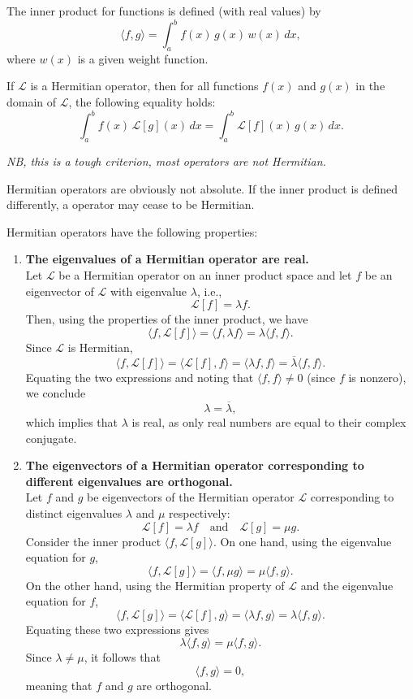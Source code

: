 \documentclass{report}
\begin{document}
The inner product for functions is defined (with real values) by
\[
\langle f, g \rangle = \int_a^b f(x)\, g(x)\, w(x) \, dx,
\]
where \(w(x)\) is a given weight function. 

If \(\mathcal{L}\) is a Hermitian operator, then for all functions \(f(x)\) and \(g(x)\) in the domain of \(\mathcal{L}\), the following equality holds:
\[
\int_a^b f(x)\, \mathcal{L}[g](x) \, dx = \int_a^b \mathcal{L}[f](x)\, g(x) \, dx.
\]

\emph{NB, this is a tough criterion, most operators are not Hermitian.}

Hermitian operators are obviously not absolute. If the inner product is defined differently, a operator may cease to be Hermitian.

Hermitian operators have the following properties:

\begin{enumerate}
  \item \textbf{The eigenvalues of a Hermitian operator are real.} \\
    Let \(\mathcal{L}\) be a Hermitian operator on an inner product space and let \(f\) be an eigenvector of \(\mathcal{L}\) with eigenvalue \(\lambda\), i.e.,
    \[
    \mathcal{L}[f] = \lambda f.
    \]
    Then, using the properties of the inner product, we have
    \[
    \langle f, \mathcal{L}[f] \rangle = \langle f, \lambda f \rangle = \lambda \langle f, f \rangle.
    \]
    Since \(\mathcal{L}\) is Hermitian,
    \[
    \langle f, \mathcal{L}[f] \rangle = \langle \mathcal{L}[f], f \rangle = \langle \lambda f, f \rangle = \overline{\lambda}\langle f, f \rangle.
    \]
    Equating the two expressions and noting that \(\langle f, f \rangle \neq 0\) (since \(f\) is nonzero), we conclude
    \[
    \lambda = \overline{\lambda},
    \]
    which implies that \(\lambda\) is real, as only real numbers are equal to their complex conjugate.

  \item \textbf{The eigenvectors of a Hermitian operator corresponding to different eigenvalues are orthogonal.} \\
    Let \(f\) and \(g\) be eigenvectors of the Hermitian operator \(\mathcal{L}\) corresponding to distinct eigenvalues \(\lambda\) and \(\mu\) respectively:
    \[
    \mathcal{L}[f] = \lambda f \quad \text{and} \quad \mathcal{L}[g] = \mu g.
    \]
    Consider the inner product \(\langle f, \mathcal{L}[g] \rangle\). On one hand, using the eigenvalue equation for \(g\),
    \[
    \langle f, \mathcal{L}[g] \rangle = \langle f, \mu g \rangle = \mu \langle f, g \rangle.
    \]
    On the other hand, using the Hermitian property of \(\mathcal{L}\) and the eigenvalue equation for \(f\),
    \[
    \langle f, \mathcal{L}[g] \rangle = \langle \mathcal{L}[f], g \rangle = \langle \lambda f, g \rangle = \lambda \langle f, g \rangle.
    \]
    Equating these two expressions gives
    \[
    \lambda \langle f, g \rangle = \mu \langle f, g \rangle.
    \]
    Since \(\lambda \neq \mu\), it follows that
    \[
    \langle f, g \rangle = 0,
    \]
    meaning that \(f\) and \(g\) are orthogonal.
\end{enumerate}
\end{document}
